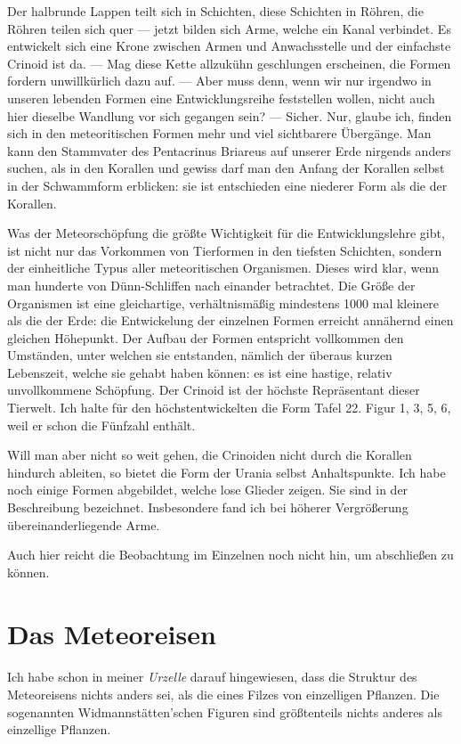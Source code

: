 \documentclass[a4paper, 12pt, oneside]{article}
\begin{document}
Der halbrunde Lappen teilt sich in Schichten, diese Schichten in Röhren, die Röhren teilen sich quer — jetzt bilden sich Arme, welche ein Kanal verbindet. Es entwickelt sich eine Krone zwischen Armen und Anwachsstelle und der einfachste Crinoid ist da. — Mag diese Kette allzukühn geschlungen erscheinen, die Formen fordern unwillkürlich dazu auf. — Aber muss denn, wenn wir nur irgendwo in unseren lebenden Formen eine Entwicklungsreihe feststellen wollen, nicht auch hier dieselbe Wandlung vor sich gegangen sein? — Sicher. Nur, glaube ich, finden sich in den meteoritischen Formen mehr und viel sichtbarere Übergänge. Man kann den Stammvater des Pentacrinus Briareus auf unserer Erde nirgends anders suchen, als in den Korallen und gewiss darf man den Anfang der Korallen selbst in der Schwammform erblicken: sie ist entschieden eine niederer Form als die der Korallen.

Was der Meteorschöpfung die größte Wichtigkeit für die Entwicklungslehre gibt, ist nicht nur das Vorkommen von Tierformen in den tiefsten Schichten, sondern der einheitliche Typus aller meteoritischen Organismen. Dieses wird klar, wenn man hunderte von Dünn-Schliffen nach einander betrachtet. Die Größe der Organismen ist eine gleichartige, verhältnismäßig mindestens 1000 mal kleinere als die der Erde: die Entwickelung der einzelnen Formen erreicht annähernd einen gleichen Höhepunkt. Der Aufbau der Formen entspricht vollkommen den Umständen, unter welchen sie entstanden, nämlich der überaus kurzen Lebenszeit, welche sie gehabt haben können: es ist eine hastige, relativ unvollkommene Schöpfung. Der Crinoid ist der höchste Repräsentant dieser Tierwelt. Ich halte für den höchstentwickelten die Form Tafel 22. Figur 1, 3, 5, 6, weil er schon die Fünfzahl enthält.

Will man aber nicht so weit gehen, die Crinoiden nicht durch die Korallen hindurch ableiten, so bietet die Form der Urania selbst Anhaltspunkte. Ich habe noch einige Formen abgebildet, welche lose Glieder zeigen. Sie sind in der Beschreibung bezeichnet. Insbesondere fand ich bei höherer Vergrößerung übereinanderliegende Arme.

Auch hier reicht die Beobachtung im Einzelnen noch nicht hin, um abschließen zu können.
\clearpage
\section{Das Meteoreisen}
\paragraph{}
Ich habe schon in meiner \emph{Urzelle} darauf hingewiesen, dass die Struktur des Meteoreisens nichts anders sei, als die eines Filzes von einzelligen Pflanzen. Die sogenannten Widmannstätten'schen Figuren sind größtenteils nichts anderes als einzellige Pflanzen.
\end{document}

